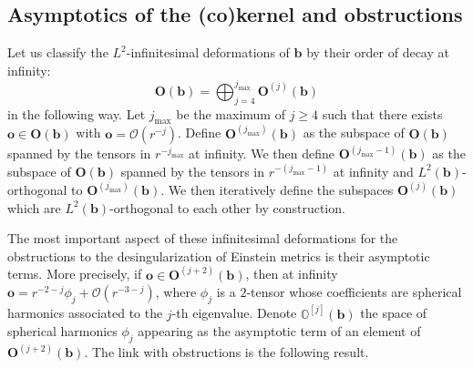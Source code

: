 \documentclass[12pt]{article}
\begin{document}
   \subsection{Asymptotics of the (co)kernel and obstructions}
   
   Let us classify the $L^2$-infinitesimal deformations of $\mathbf{b}$ by their order of decay at infinity:
   $$ \mathbf{O}(\mathbf{b}) = \bigoplus_{j = 4}^{j_{\max}} \mathbf{O}^{(j)}(\mathbf{b}) $$
   in the following way. Let $j_{\max}$ be the maximum of $j\geqslant 4$ such that there exists $\mathbf{o}\in \mathbf{O}(\mathbf{b})$ with $ \mathbf{o} = \mathcal{O}(r^{-j}) $. Define $\mathbf{O}^{(j_{\max})}(\mathbf{b})$ as the subspace of $\mathbf{O}(\mathbf{b})$ spanned by the tensors in $r^{-j_{\max}}$ at infinity. We then define $\mathbf{O}^{(j_{\max}-1)}(\mathbf{b})$ as the subspace of $\mathbf{O}(\mathbf{b})$ spanned by the tensors in $r^{-(j_{\max}- 1)}$ at infinity and $L^2(\mathbf{b})$-orthogonal to $\mathbf{O}^{(j_{\max})}(\mathbf{b})$. We then iteratively define the subspaces $\mathbf{O}^{(j)}(\mathbf{b})$ which are $L^2(\mathbf{b})$-orthogonal to each other by construction.
   
   The most important aspect of these infinitesimal deformations for the obstructions to the desingularization of Einstein metrics is their asymptotic terms. More precisely, if $\mathbf{o}\in \mathbf{O}^{(j+2)}(\mathbf{b})$, then at infinity $\mathbf{o} = r^{-2-j} \phi_{j} + \mathcal{O}(r^{-3-j})$, where $\phi_{j}$ is a $2$-tensor whose coefficients are spherical harmonics associated to the $j$-th eigenvalue. Denote 
   $ \mathbb{O}^{[j]}(\mathbf{b}) $ the space of spherical harmonics $\phi_{j}$ appearing as the asymptotic term of an element of $\mathbf{O}^{(j+2)}(\mathbf{b})$. The link with obstructions is the following result.
   
\end{document}
